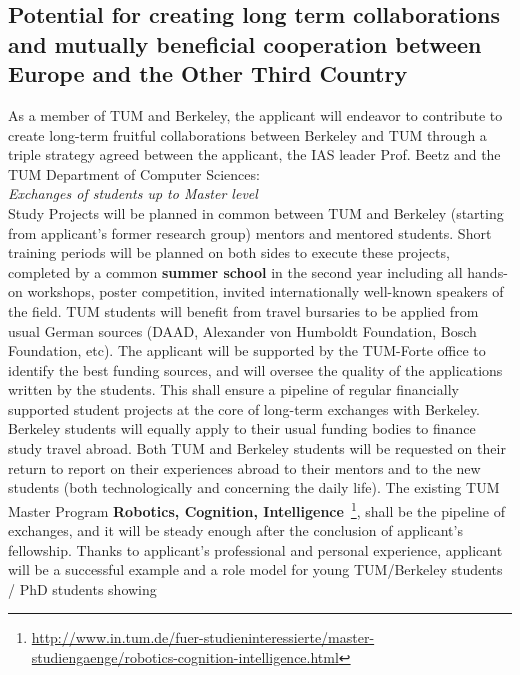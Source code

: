 \subsection{Potential for creating long term collaborations and mutually beneficial cooperation between 
Europe and the Other Third Country} 
As a member of TUM and Berkeley, the applicant  will endeavor to contribute to create long-term
fruitful  collaborations  between  Berkeley and TUM through  a triple strategy 
agreed between the applicant, the IAS  leader Prof.  Beetz and the  TUM Department  
of  Computer Sciences:\\
\emph{Exchanges  of students  up  to  Master level}\\  
Study  Projects will  be planned in common between TUM and  Berkeley
(starting  from  applicant's  former   research  group)  mentors  and  mentored
students.  Short training  periods will  be planned  on both  sides to
execute these  projects, completed  by a common  \textbf{summer school}  in the
second  year  including all  hands-on  workshops, poster  competition,
invited  internationally  well-known   speakers  of  the  field.   TUM
students will benefit  from travel bursaries to be  applied from usual
German  sources  (DAAD,   Alexander  von  Humboldt  Foundation,  Bosch
Foundation, etc). 
The applicant will be supported  by the TUM-Forte office to identify the
best  funding  sources,  and    will  oversee  the  quality  of  the
applications written by the students.  This shall ensure a pipeline of
regular  financially  supported  student   projects  at  the  core  of
long-term  exchanges  with   Berkeley. Berkeley  students will equally  apply to
their usual funding bodies to finance study travel abroad.  Both TUM and
Berkeley students  will be  requested on
their return  to report on  their experiences abroad to  their mentors
and to the new students (both technologically and concerning the daily
life).   The  existing  TUM  Master  Program  \textbf{Robotics,  Cognition,
Intelligence}~\footnote{\url{http://www.in.tum.de/fuer-studieninteressierte/master-studiengaenge/robotics-cognition-intelligence.html}}, 
shall  be the  pipeline of exchanges,  and it  will be
steady  enough after  the conclusion  of applicant's  fellowship.  Thanks  to applicant's
professional and  personal experience, applicant will be  a successful example
and  a role  model for  young TUM/Berkeley  students /  PhD  students showing
